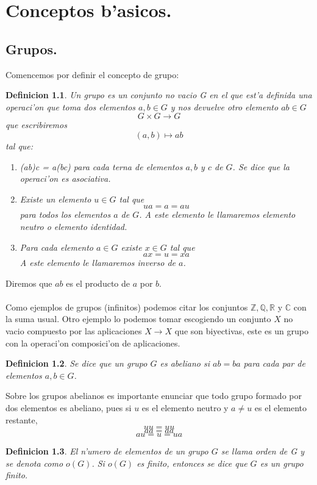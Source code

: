 \documentclass[a4paper,openright,12pt]{book}
\numberwithin{equation}{section} %
\newtheorem{definicion}{Definicion}[section] %
\begin{document}
\chapter{Conceptos b'asicos.}
\section{Grupos.}
Comencemos por definir el concepto de grupo:
\begin{definicion}
Un grupo es un conjunto no vacio G en el que est'a definida una operaci'on que toma dos elementos $a,b \in G$ y nos devuelve otro elemento $ab \in G$
 \[G \times G \rightarrow G \]
que escribiremos \[ (a,b) \mapsto ab \]
tal que:
\begin{enumerate}
\item \textit{(ab)c} = \textit{a(bc)} para cada terna de elementos $a,b$ y $c$ de $G$. Se dice que la operaci'on es \textit{asociativa}.
\item Existe un elemento $u \in G$ tal que \[ua =a=au\] para todos los elementos $a$ de $G$. A este elemento le llamaremos \textit{elemento neutro o elemento identidad}.
\item Para cada elemento $a \in G$ existe $x \in G$ tal que \[ax=u=xa\] A este elemento le llamaremos \textit{inverso} de $a$.
\end{enumerate}
\end{definicion}
Diremos que $ab$ es el producto de $a$ por $b$.\\
\\
Como ejemplos de grupos (infinitos) podemos citar los conjuntos $ \mathbb{Z}, \mathbb{Q}, \mathbb{R}$ y $ \mathbb{C}$ con la suma usual. Otro ejemplo lo podemos tomar escogiendo un conjunto $X$ no vacio compuesto por las aplicaciones $X \rightarrow X$ que son biyectivas, este es un grupo con la operaci'on composici'on de aplicaciones.
\begin{definicion}
Se dice que un grupo $G$ es abeliano si $ab=ba$ para cada par de elementos $a,b \in G$.
\end{definicion}
Sobre los grupos abelianos es importante enunciar que todo grupo formado por dos elementos es abeliano, pues si $u$ es el elemento neutro y $a \neq u$ es el elemento restante, \[ uu=uu\] \[ aa=aa\] \[ au=u=ua\]
\begin{definicion}
El n'umero de elementos de un grupo $G$ se llama \textit{orden de G} y se denota como $o(G)$. Si $o(G)$ es finito, entonces se dice que $G$ es un \textit{grupo finito}.
\end{definicion}
\end{document}
